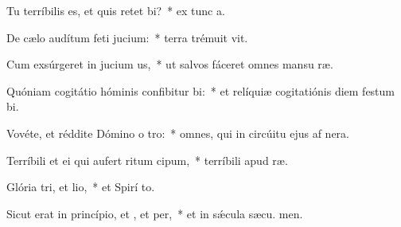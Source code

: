 \item Tu terríbilis es, et quis retet bi?~* ex tunc  a.
\item De cælo audítum feti jucium:~* terra trémuit  vit.
\item Cum exsúrgeret in jucium us,~* ut salvos fáceret omnes mansu ræ.
\item Quóniam cogitátio hóminis confibitur bi:~* et relíquiæ cogitatiónis diem festum  bi.
\item Vovéte, et réddite Dómino o tro:~* omnes, qui in circúitu ejus af nera.
\item Terríbili et ei qui aufert ritum cipum,~* terríbili apud  ræ.
\item Glória tri, et lio,~* et Spirí to.
\item Sicut erat in princípio, et , et per,~* et in sǽcula sæcu. men.
